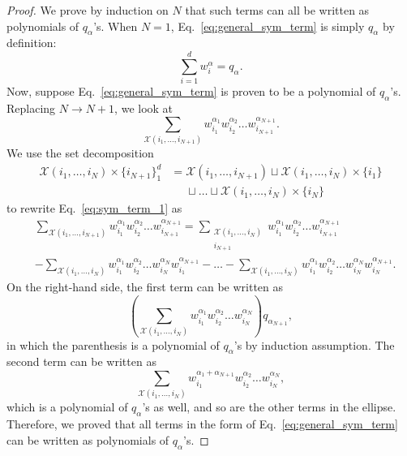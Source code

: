 \documentclass{article}
\theoremstyle{plain}
\begin{document}
\begin{proof}
    We prove by induction on $N$ that such terms can all be written as polynomials of $q_\alpha$'s. When $N=1$, Eq.~\eqref{eq:general_sym_term} is simply $q_\alpha$ by definition:
    \begin{equation}
        \sum_{i=1}^d w_i^\alpha = q_\alpha  .
    \end{equation}
    Now, suppose Eq.~\eqref{eq:general_sym_term} is proven to be a polynomial of $q_\alpha$'s. Replacing $N\to N+1$, we look at
    \begin{equation} \label{eq:sym_term_1}
        \sum_{\mathcal{X}(i_1, \dots, i_{N+1})} w_{i_1}^{\alpha_1} w_{i_2}^{\alpha_2} \dots w_{i_{N+1}}^{\alpha_{N+1}}  .
    \end{equation}
    We use the set decomposition
    \begin{equation}
        \begin{aligned}
        \mathcal{X}(i_1, \dots, i_{N}) \times \{i_{N+1}\}_{1}^d
        &= \mathcal{X}(i_1, \dots, i_{N+1})
        \sqcup \mathcal{X}(i_1, \dots, i_{N}) \times \{i_1\} \\
        &\phantom{=} 
        \sqcup \dots
        \sqcup \mathcal{X}(i_1, \dots, i_{N}) \times \{i_N\}
        \end{aligned}
    \end{equation}
    to rewrite Eq.~\eqref{eq:sym_term_1} as
    \begin{equation}
        \begin{aligned}
            &\sum_{\mathcal{X}(i_1, \dots, i_{N+1})} w_{i_1}^{\alpha_1} w_{i_2}^{\alpha_2} \dots w_{i_{N+1}}^{\alpha_{N+1}}
            = \sum_{\substack{\mathcal{X}(i_1, \dots, i_{N}) \\ i_{N+1}}} w_{i_1}^{\alpha_1} w_{i_2}^{\alpha_2} \dots w_{i_{N+1}}^{\alpha_{N+1}} \\
            &- \sum_{\mathcal{X}(i_1, \dots, i_{N})} w_{i_1}^{\alpha_1} w_{i_2}^{\alpha_2} \dots w_{i_{N}}^{\alpha_{N}} w_{i_{1}}^{\alpha_{N+1}} - \dots
            - \sum_{\mathcal{X}(i_1, \dots, i_{N})} w_{i_1}^{\alpha_1} w_{i_2}^{\alpha_2} \dots w_{i_{N}}^{\alpha_{N}} w_{i_{N}}^{\alpha_{N+1}} .
        \end{aligned}
    \end{equation}
    On the right-hand side, the first term can be written as
    \begin{equation}
        \left( \sum_{\mathcal{X}(i_1, \dots, i_{N})} w_{i_1}^{\alpha_1} w_{i_2}^{\alpha_2} \dots w_{i_{N}}^{\alpha_{N}}\right)
        q_{\alpha_{N+1}}   ,
    \end{equation}
    in which the parenthesis is a polynomial of $q_\alpha$'s by induction assumption. The second term can be written as 
    \begin{equation}
        \sum_{\mathcal{X}(i_1, \dots, i_{N})} w_{i_1}^{\alpha_1+\alpha_{N+1}} w_{i_2}^{\alpha_2} \dots w_{i_{N}}^{\alpha_{N}}   ,
    \end{equation}
    which is a polynomial of $q_\alpha$'s as well, and so are the other terms in the ellipse. Therefore, we proved that all terms in the form of Eq.~\eqref{eq:general_sym_term} can be written as polynomials of $q_\alpha$'s. 



\end{proof}
\end{document}
